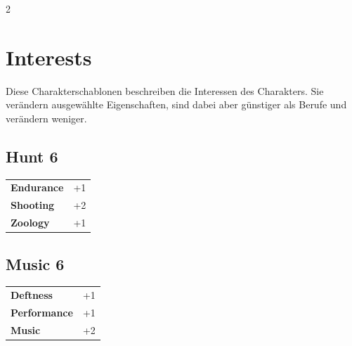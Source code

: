 \begin{multicols}{2}
\begin{tcolorbox}
\end{tcolorbox}

\section{Interests}

Diese Charakterschablonen beschreiben die Interessen des Charakters. Sie verändern ausgewählte Eigenschaften, sind dabei aber günstiger als Berufe und verändern weniger.

\begin{tcolorbox}
    \subsection*{Hunt \hfill \small{6 }}
    \tcblower




\begin{tabular}{@{}ll@{}}
    \textbf{Endurance} & +1\\
    \textbf{Shooting} & +2\\
    \textbf{Zoology} & +1\\
\end{tabular}


\end{tcolorbox}

\begin{tcolorbox}
    \subsection*{Music \hfill \small{6 }}
    \tcblower




\begin{tabular}{@{}ll@{}}
    \textbf{Deftness} & +1\\
    \textbf{Performance} & +1\\
    \textbf{Music} & +2\\
\end{tabular}


\end{tcolorbox}

\begin{tcolorbox}

\end{tcolorbox}
\end{multicols}
